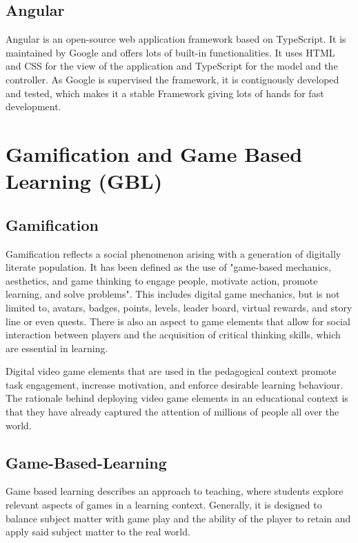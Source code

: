 \subsection{Angular}\label{subsec:angular}
Angular is an open-source web application framework based on TypeScript.
It is maintained by Google and offers lots of built-in functionalities.
It uses HTML and CSS for the view of the application and TypeScript for the model and the controller.
As Google is supervised the framework, it is contiguously developed and tested,
which makes it a stable Framework giving lots of hands for fast development.

\section{Gamification and Game Based Learning (GBL)}\label{sec:gamification-and-game-based-learninggbl}
\subsection{Gamification}\label{subsec:gamification}
Gamification reflects a social phenomenon arising with a generation of digitally literate population.
It has been defined as the use of "game-based mechanics, aesthetics, and game thinking to engage people,
motivate action, promote learning, and solve problems"\cite{kapp2013gamification}.
This includes digital game mechanics, but is not limited to, avatars, badges, points, levels,
leader board, virtual rewards, and story line or even quests.
There is also an aspect to game elements that allow for social interaction between players and the acquisition of
critical thinking skills, which are essential in learning.

Digital video game elements that are used in the pedagogical context promote task engagement, increase motivation,
and enforce desirable learning behaviour.
The rationale behind deploying video game elements in an educational context is that they have already captured the
attention of millions of people all over the world.

\subsection{Game-Based-Learning}\label{subsec:game-based-learning}
Game based learning describes an approach to teaching,
where students explore relevant aspects of games in a learning context.
Generally, it is designed to balance subject matter with game play and the ability of the player
to retain and apply said subject matter to the real world.

